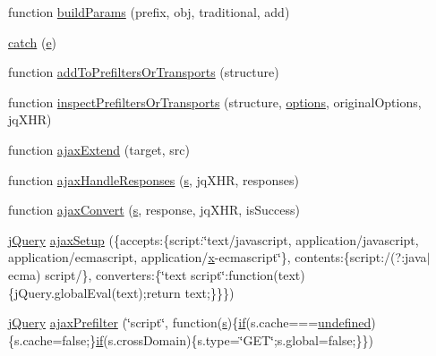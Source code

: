 \begin{DoxyCompactItemize}
\item 
function \hyperlink{_scripts_2jquery-1_810_82_8js_a3c4f3b337daa2444fa73ee856be5f9d8}{build\+Params} (prefix, obj, traditional, add)
\item 
\hyperlink{_scripts_2jquery-1_810_82_8js_a5bf45fc51bc0426586792b5f9cb95431}{catch} (\hyperlink{_scripts_2respond_8min_8js_a2c038346d47955cbe2cb91e338edd7e1}{e})
\item 
function \hyperlink{_scripts_2jquery-1_810_82_8js_ae8bffbac8c6b2208e0ca37b475ec0b70}{add\+To\+Prefilters\+Or\+Transports} (structure)
\item 
function \hyperlink{_scripts_2jquery-1_810_82_8js_ac96b244aea80657fe2d6e3d2c1e8b622}{inspect\+Prefilters\+Or\+Transports} (structure, \hyperlink{_scripts_2dropzone_8js_a601a442fa75a5a2657a41da857c71b55}{options}, original\+Options, jq\+X\+H\+R)
\item 
function \hyperlink{_scripts_2jquery-1_810_82_8js_a113ade43cfd5328ebd5ccc84f45fe4de}{ajax\+Extend} (target, src)
\item 
function \hyperlink{_scripts_2jquery-1_810_82_8js_a71c2db7846f21963cee426cb81003c63}{ajax\+Handle\+Responses} (\hyperlink{_scripts_2respond_8min_8js_ad9a7d92cb87932d25187fdec3ba1b621}{s}, jq\+X\+H\+R, responses)
\item 
function \hyperlink{_scripts_2jquery-1_810_82_8js_a549518271b8708165811ae69c274b58a}{ajax\+Convert} (\hyperlink{_scripts_2respond_8min_8js_ad9a7d92cb87932d25187fdec3ba1b621}{s}, response, jq\+X\+H\+R, is\+Success)
\item 
\hyperlink{_scripts_2jquery-1_810_82_8js_a41c2e1bff4a6b292938143764e31d789}{j\+Query} \hyperlink{_scripts_2jquery-1_810_82_8js_a52a40924d02e0d9756f051e36a640cd6}{ajax\+Setup} (\{accepts\+:\{script\+:\char`\"{}text/javascript, application/javascript, application/ecmascript, application/\hyperlink{_scripts_2jquery-1_810_82_8min_8js_a5ce50d751c9664d05375c8f5080ed43e}{x}-\/ecmascript\char`\"{}\}, contents\+:\{script\+:/(?\+:java$\vert$ecma) script/\}, converters\+:\{\char`\"{}text script\char`\"{}\+:function(text)\{j\+Query.\+global\+Eval(text);return text;\}\}\})
\item 
\hyperlink{_scripts_2jquery-1_810_82_8js_a41c2e1bff4a6b292938143764e31d789}{j\+Query} \hyperlink{_scripts_2jquery-1_810_82_8js_a144939e373cc1ad511a53c4251ec7ffa}{ajax\+Prefilter} (\char`\"{}script\char`\"{}, function(\hyperlink{_scripts_2respond_8min_8js_ad9a7d92cb87932d25187fdec3ba1b621}{s})\{\hyperlink{_scripts_2respond_8min_8js_a93851d60dd037a83509a1757b9ee7b66}{if}(s.\+cache===\hyperlink{_scripts_2jquery-1_810_82_8js_a08113a236cc18d2a9d5ce27e638012be}{undefined})\{s.\+cache=false;\}\hyperlink{_scripts_2respond_8min_8js_a93851d60dd037a83509a1757b9ee7b66}{if}(s.\+cross\+Domain)\{s.\+type=\char`\"{}G\+E\+T\char`\"{};s.\+global=false;\}\})

\end{DoxyCompactItemize}
